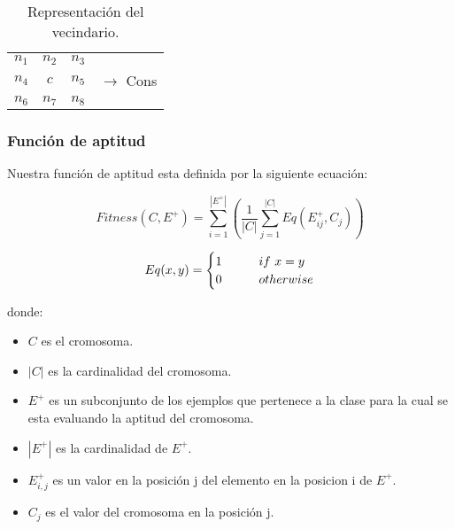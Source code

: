 \begin{table}[H]
	\begin{center}
		\begin{tabular}{ c c c c}
			$n_1$&$n_2$&$n_3$&\\
			$n_4$&$c$&$n_5$& $\rightarrow$ Cons\\
			$n_6$&$n_7$&$n_8$&\\
		\end{tabular}
	\end{center}
	\caption{\label{tab:bylneigh} Representación del vecindario.}
\end{table}

\begin{table}[H]
	\begin{center}
	\end{center}
	\caption{\label{tab:bylneigh} Representación del la codificación.}
\end{table}

\subsubsection{Función de aptitud}

Nuestra función de aptitud esta definida por la siguiente ecuación:

\[Fitness(C,E^{+})=\sum_{i=1}^{|E^{+}|} \left(\frac{1}{|C|}\sum_{j=1}^{|C|} Eq(E^{+}_{ij},C_{j}) \right)\]

\[
Eq(x,y)=
\begin{cases}
\text1 &\qquad if\ x=y \\
\text0 &\qquad otherwise
\end{cases}
\]

donde:
\begin{itemize}
	\item \(C\) es el cromosoma.
	\item \(|C|\) es la cardinalidad del cromosoma.
	\item \(E^{+}\) es un subconjunto de los ejemplos que pertenece a la clase para la cual se esta evaluando la aptitud del cromosoma.
	\item \(|E^{+}|\) es la cardinalidad de $E^+$.
	\item \(E^{+}_{i,j}\) es un valor en la posición j del elemento en la posicion i de $E^+$.
	\item \(C_{j}\) es el valor del cromosoma en la posición j.
\end{itemize}

